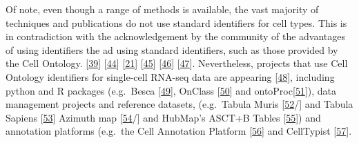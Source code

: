 Of note, even though a range of methods is available, the vast majority of techniques and publications do not use standard identifiers for cell types.
This is in contradiction with the acknowledgement by the community of the advantages of using identifiers the ad using standard identifiers, such as those provided by the Cell Ontology. {[}\protect\hyperlink{ref-ii1dVqoy}{39}{]} {[}\protect\hyperlink{ref-tvnuubVW}{44}{]} {[}\protect\hyperlink{ref-J5X2Xu6M}{21}{]} {[}\protect\hyperlink{ref-agnqfdk6}{45}{]} {[}\protect\hyperlink{ref-SozKx0lF}{46}{]} {[}\protect\hyperlink{ref-15xnotFsw}{47}{]}.
Nevertheless, projects that use Cell Ontology identifiers for single-cell RNA-seq data are appearing {[}\protect\hyperlink{ref-qT8WxqjA}{48}{]}, including python and R packages (e.g.~Besca {[}\protect\hyperlink{ref-P1gDLuog}{49}{]}, OnClass {[}\protect\hyperlink{ref-sW6aNZJB}{50}{]} and ontoProc{[}\protect\hyperlink{ref-15YmDXALp}{51}{]}), data management projects and reference datasets, (e.g.~Tabula Muris {[}\protect\hyperlink{ref-tdlWsvTd}{52}/{]} and Tabula Sapiens {[}\protect\hyperlink{ref-FjUqVIOp}{53}{]} Azimuth map {[}\protect\hyperlink{ref-T7RxnUNw}{54}/{]} and HubMap's ASCT+B Tables {[}\protect\hyperlink{ref-1FghWzORJ}{55}{]}) and annotation platforms (e.g.~the Cell Annotation Platform {[}\protect\hyperlink{ref-yMavNVkS}{56}{]} and CellTypist {[}\protect\hyperlink{ref-123DiCgc8}{57}{]}.

